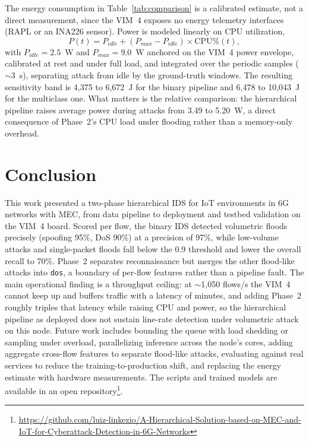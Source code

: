 \documentclass[conference]{IEEEtran}
\begin{document}
The energy consumption in Table~\ref{tab:comparison} is a calibrated estimate,
not a direct measurement, since the VIM~4 exposes no energy telemetry
interfaces (RAPL or an INA226 sensor). Power is modeled linearly on CPU
utilization,
\begin{equation}
P(t) = P_{idle} + (P_{max} - P_{idle}) \times \text{CPU\%}(t),
\label{eq:power}
\end{equation}
with $P_{idle} = 2.5$~W and $P_{max} = 9.0$~W anchored on the VIM~4 power
envelope, calibrated at rest and under full load, and integrated over the
periodic samples ($\sim$3~s), separating attack from idle by the ground-truth
windows. The resulting sensitivity band is 4{,}375 to 6{,}672~J for the binary
pipeline and 6{,}478 to 10{,}043~J for the multiclass one. What matters is the
relative comparison: the hierarchical pipeline raises average power during
attacks from 3.49 to 5.20~W, a direct consequence of Phase~2's CPU load under
flooding rather than a memory-only overhead.

\section{Conclusion}
\label{sec:conclusion}

This work presented a two-phase hierarchical IDS for IoT environments in 6G
networks with MEC, from data pipeline to deployment and testbed validation on
the VIM~4 board. Scored per flow, the binary IDS detected volumetric floods
precisely (spoofing 95\%, DoS 90\%) at a precision of 97\%, while low-volume
attacks and single-packet floods fall below the 0.9 threshold and lower the
overall recall to 70\%. Phase~2 separates reconnaissance but merges the other
flood-like attacks into \texttt{dos}, a boundary of per-flow features rather
than a pipeline fault. The main operational finding is a throughput ceiling: at
$\sim$1{,}050 flows/s the VIM~4 cannot keep up and buffers traffic with a
latency of minutes, and adding Phase~2 roughly triples that latency while
raising CPU and power, so the hierarchical pipeline as deployed does not sustain
line-rate detection under volumetric attack on this node. Future work includes
bounding the queue with load shedding or sampling under overload, parallelizing
inference across the node's cores, adding aggregate cross-flow features to
separate flood-like attacks, evaluating against real services to reduce the
training-to-production shift, and replacing the energy estimate with hardware
measurements. The scripts and trained models are available in an open
repository\footnote{\url{https://github.com/luiz-linkezio/A-Hierarchical-Solution-based-on-MEC-and-IoT-for-Cyberattack-Detection-in-6G-Networks}}.



\end{document}
